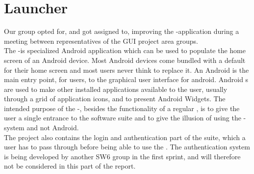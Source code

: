 
\section{Launcher}

Our group opted for, and got assigned to, improving the \giraf-\launcher application during a meeting between representatives of the GUI project area groups.\\

The \giraf-\launcher is specialized Android \launcher application which can be used to populate the home screen of an Android device. Most Android devices come bundled with a default \launcher for their home screen and most users never think to replace it. An Android \launcher is the main entry point, for users, to the graphical user interface for android. Android \launcher{}s are used to make other installed applications available to the user, usually through a grid of application icons, and to present Android Widgets. The intended purpose of the \giraf-\launcher, besides the functionality of a regular \launcher, is to give the user a single entrance to the \giraf software suite and to give the illusion of using the \giraf-system and not Android.\\

The \launcher project also contains the login and authentication part of the \giraf suite, which a user has to pass through before being able to use the \launcher. The authentication system is being developed by another SW6 group in the first sprint, and will therefore not be considered in this part of the report. 